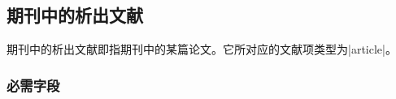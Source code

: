 
\subsection{期刊中的析出文献}\label{subsec:bibtype-article}

期刊中的析出文献即指期刊中的某篇论文。它所对应的{\BibTeX}文献项类型为|article|。

\subsubsection{必需字段}

